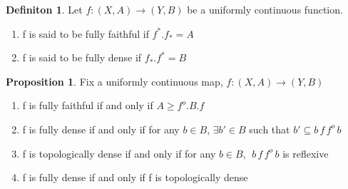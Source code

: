 \documentclass[18pt,a4paper]{article}
\theoremstyle{definition}
\newtheorem{definition}[theorem]{Definiton}
\newtheorem{proop}[theorem]{Proposition}
\begin{document}
	\begin{definition} %
		Let $f:(X,A) \to (Y,B)$ be a uniformly continuous function.
		\begin{enumerate}[label=\Roman*]
			\item f is said to be fully faithful if	$f^* .f_*=A $
			\item f is said to be fully dense if $f_* .f^*=B $
		\end{enumerate}
	\end{definition}
	\begin{proop}
		Fix a uniformly continuous map, $f:(X,A) \rightarrow (Y,B)$
		\begin{enumerate}[label=(\alph*)]
			\item f is fully faithful if and only if $A\geq f^o.B.f$
			\item f is fully dense if and only if for any $b\in B$, $\exists b' \in B$
				such that $b' \subseteq b\,f\,f^o \,b$
			\item f is topologically dense if and only if for any $b\in B$,
				$\; b \, f\, f^o\,b$ is reflexive
			\item f is fully dense if and only if f is topologically dense
		\end{enumerate}
	\end{proop}
\end{document}
